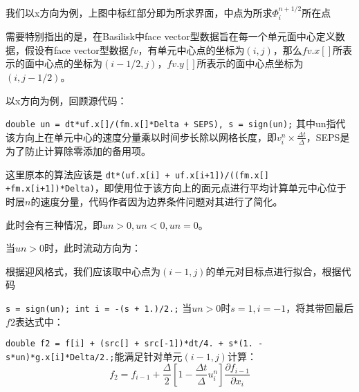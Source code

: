\documentclass[lang=cn,11pt,a4paper]{elegantpaper}
\begin{document}
我们以x方向为例，上图中标红部分即为所求界面，中点为所求$\Phi^{n+1/2}_i$所在点\par
需要特别指出的是，在Basilisk中face vector型数据旨在每一个单元面中心定义数据，假设有face vector型数据$fv$，有单元中心点的坐标为$(i,j)$，那么$fv.x[]$所表示的面中心点的坐标为$(i-1/2,j)$，$fv.y[]$所表示的面中心点坐标为$(i,j-1/2)$。\par
以x方向为例，回顾源代码：\par
\texttt{double un = dt*uf.x[]/(fm.x[]*Delta + SEPS), s = sign(un);} 其中un指代该方向上在单元中心的速度分量乘以时间步长除以网格长度，即$v_i^n\times \frac{\Delta t}{\Delta}$，SEPS是为了防止计算除零添加的备用项。\par
这里原本的算法应该是
\texttt{dt*(uf.x[i] + uf.x[i+1])/((fm.x[] +fm.x[i+1])*Delta)}，即使用位于该方向上的面元点进行平均计算单元中心位于时层$n$的速度分量，代码作者因为边界条件问题对其进行了简化。\par
此时会有三种情况，即$un>0,un<0,un=0$。\par
当$un>0$时，此时流动方向为：
\begin{center}
\end{center}
根据迎风格式，我们应该取中心点为$(i-1,j)$的单元对目标点进行拟合，根据代码\par
\texttt{s = sign(un); int i = -(s + 1.)/2.;}
当$un>0$时$s = 1, i = -1$，将其带回最后$f2$表达式中：\par
\texttt{double f2 = f[i] + (src[] + src[-1])*dt/4. + s*(1. - s*un)*g.x[i]*Delta/2.;}能满足针对单元$(i-1,j)$计算：
\begin{equation}
    f_2=f_{i-1}+\frac{\Delta}{2}[1-\frac{\Delta t}{\Delta}u_i^{n}]\frac{\partial f_{i-1}}{\partial x_i}
\end{equation}\par
\end{document}
